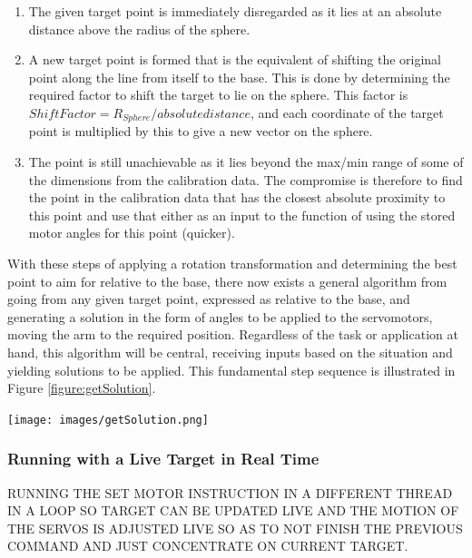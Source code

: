 \documentclass[11pt]{article}
\begin{document}
\begin{enumerate}
\item{The given target point is immediately disregarded as it lies at an absolute distance above the radius of the sphere.}
\item{A new target point is formed that is the equivalent of shifting the original point along the line from itself to the base. This is done by determining the required factor to shift the target to lie on the sphere. This factor is $Shift Factor = R_{Sphere} / absolute distance$, and each coordinate of the target point is multiplied by this to give a new vector on the sphere.}
\item{The point is still unachievable as it lies beyond the max/min range of some of the dimensions from the calibration data. The compromise is therefore to find the point in the calibration data that has the closest absolute proximity to this point and use that either as an input to the function of using the stored motor angles for this point (quicker). }
\end{enumerate}

With these steps of applying a rotation transformation and determining the best point to aim for relative to the base, there now exists a general algorithm from going from any given target point, expressed as relative to the base, and generating a solution in the form of angles to be applied to the servomotors, moving the arm to the required position. Regardless of the task or application at hand, this algorithm will be central, receiving inputs based on the situation and yielding solutions to be applied. This fundamental step sequence is illustrated in Figure \ref{figure:getSolution}.


\begin{center}
\texttt{[image: images/getSolution.png]}
\label{figure:getSolution}
\end{center}

\subsubsection{Running with a Live Target in Real Time}
RUNNING THE SET MOTOR INSTRUCTION IN A DIFFERENT THREAD IN A LOOP SO TARGET CAN BE UPDATED LIVE AND THE MOTION OF THE SERVOS IS ADJUSTED LIVE SO AS TO NOT FINISH THE PREVIOUS COMMAND AND JUST CONCENTRATE ON CURRENT TARGET.
\end{document}
